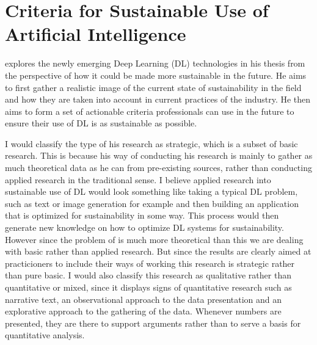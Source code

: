 \documentclass{article}
\begin{document}
\newpage
\section{Criteria for Sustainable Use of Artificial Intelligence}


\textcite{T1} explores the newly emerging Deep Learning (DL) technologies in 
his thesis from the perspective of how it could be made more sustainable in the 
future. He aims to first gather a realistic image of the current state of 
sustainability in the field and how they are taken into account in current 
practices of the industry. He then aims to form a set of actionable criteria 
professionals can use in the future to ensure their use of DL is as 
sustainable as possible.\parencite{T1}


	\par I would classify the type of his research as strategic, which is 
a subset of basic research.\parencite{V2} This is because his way of 
conducting his research is mainly to gather as much theoretical data as he can 
from pre-existing sources, rather than conducting applied research in the 
traditional sense. I believe applied research into sustainable use of DL would 
look something like taking a typical DL problem, such as text or image 
generation for example and then building an application that is optimized for 
sustainability in some way. This process would then generate new knowledge on 
how to optimize DL systems for sustainability. However since the problem of 
\textcite{T1} is much more theoretical than this we are dealing with basic 
rather than applied research. But since the results are clearly aimed at 
practicioners to include their ways of working this research is strategic 
rather than pure basic. I would also classify this research as qualitative 
rather than quantitative or mixed, since it displays signs of quantitative 
research such as narrative text, an observational approach to the data 
presentation and an explorative approach to the gathering of the 
data.\parencite{V2} Whenever numbers are presented, they are there to support 
arguments rather than to serve a basis for quantitative analysis.
\end{document}
